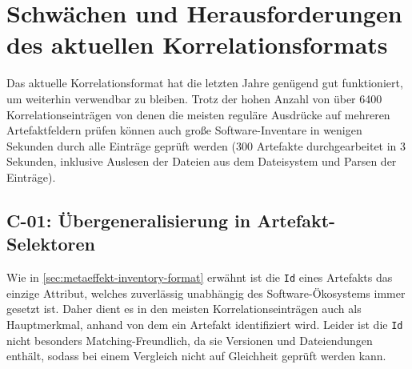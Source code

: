 \section{Schwächen und Herausforderungen des aktuellen Korrelationsformats}\label{sec:current-correlation-weaknesses}


Das aktuelle Korrelationsformat hat die letzten Jahre genügend gut funktioniert, um weiterhin verwendbar zu bleiben.
Trotz der hohen Anzahl von über 6400 Korrelationseinträgen von denen die meisten reguläre Ausdrücke auf mehreren Artefaktfeldern prüfen können auch große Software-Inventare in wenigen Sekunden durch alle Einträge geprüft werden (300 Artefakte durchgearbeitet in 3 Sekunden, inklusive Auslesen der Dateien aus dem Dateisystem und Parsen der Einträge).

\subsection{C-01: Übergeneralisierung in Artefakt-Selektoren}\label{subsec:c-01-unspezifische-identifikation-von-artefakten}

%
%

Wie in \autoref{sec:metaeffekt-inventory-format} erwähnt ist die \texttt{Id} eines Artefakts das einzige Attribut, welches zuverlässig unabhängig des Software-Ökosystems immer gesetzt ist.
Daher dient es in den meisten Korrelationseinträgen auch als Hauptmerkmal, anhand von dem ein Artefakt identifiziert wird.
Leider ist die \texttt{Id} nicht besonders Matching-Freundlich, da sie Versionen und Dateiendungen enthält, sodass bei einem Vergleich nicht auf Gleichheit geprüft werden kann.

